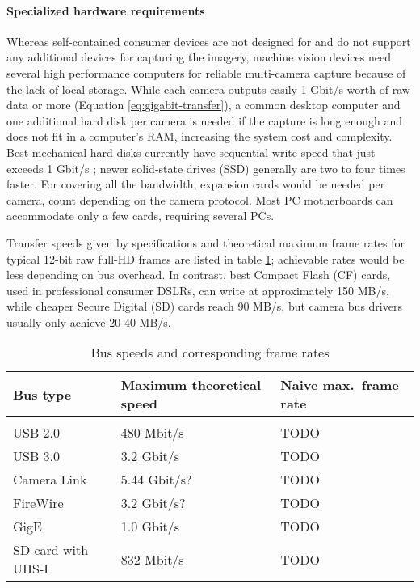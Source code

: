 \paragraph{Specialized hardware requirements}
Whereas self-contained consumer devices are not designed for and do not support any additional devices for capturing the imagery, machine vision devices need several high performance computers for reliable multi-camera capture because of the lack of local storage.
While each camera outputs easily 1 Gbit/s worth of raw data or more (Equation \ref{eq:gigabit-transfer}), a common desktop computer and one additional hard disk per camera is needed if the capture is long enough and does not fit in a computer's RAM, increasing the system cost and complexity.
Best mechanical hard disks currently have sequential write speed that just exceeds 1 Gbit/s \cite{wdtaijotain};
newer solid-state drives (SSD) generally are two to four times faster. \cite{todo}
For covering all the bandwidth, expansion cards would be needed per camera, count depending on the camera protocol.
Most PC motherboards can accommodate only a few cards, requiring several PCs.

Transfer speeds given by specifications and theoretical maximum frame rates for typical 12-bit raw full-HD frames are listed in table \ref{tab:busspeeds}; achievable rates would be less depending on bus overhead.
In contrast, best Compact Flash (CF) cards, used in professional consumer DSLRs, can write at approximately 150 MB/s, while cheaper Secure Digital (SD) cards reach 90 MB/s, but camera bus drivers usually only achieve 20-40 MB/s. \cite{todo} %

\begin{table}[h]
	\centering
	\begin{tabular}{l l l}
		Bus type & Maximum theoretical speed & Naive max.\ frame rate\\
		\hline \\
		USB 2.0 & 480 Mbit/s & TODO\\
		USB 3.0 & 3.2 Gbit/s & TODO\\
		Camera Link & 5.44 Gbit/s? & TODO\\
		FireWire & 3.2 Gbit/s? & TODO\\
		GigE & 1.0 Gbit/s & TODO\\
		SD card with UHS-I & 832 Mbit/s & TODO\\
	\end{tabular}
	\caption{Bus speeds and corresponding frame rates}
	\label{tab:busspeeds}
\end{table}

